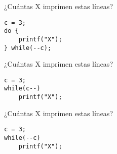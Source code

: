 \question ¿Cuántas X imprimen estas líneas?
\begin{lstlisting}
c = 3; 
do { 
	printf("X"); 
} while(--c);
\end{lstlisting}

\question ¿Cuántas X imprimen estas líneas?
\begin{lstlisting}
c = 3; 
while(c--) 
	printf("X"); 
\end{lstlisting}

\question ¿Cuántas X imprimen estas líneas?
\begin{lstlisting}
c = 3; 
while(--c) 
	printf("X");
\end{lstlisting}
